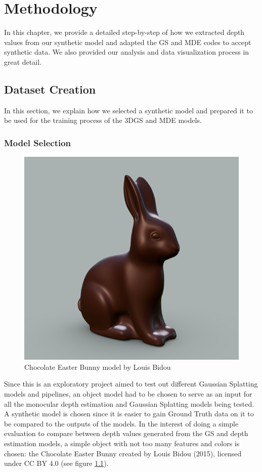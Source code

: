 
\chapter{Methodology}\label{chapter:methodology}

In this chapter, we provide a detailed step-by-step of how we extracted depth values from our synthetic model and adapted the GS and MDE codes to accept synthetic data. We also provided our analysis and data visualization process in great detail. 

\section{Dataset Creation}

In this section, we explain how we selected a synthetic model and prepared it to be used for the training process of the 3DGS and MDE models.

\subsection{Model Selection}

\begin{figure}[h]
    \centering
    \includegraphics[width=0.5\linewidth]{figures/chocolate-easter-bunny.png}
    \caption{Chocolate Easter Bunny model by Louis Bidou}
    \label{fig:chocolate-bunny}
\end{figure}

Since this is an exploratory project aimed to test out different Gaussian Splatting models and pipelines, an object model had to be chosen to serve as an input for all the monocular depth estimation and Gaussian Splatting models being tested. A synthetic model is chosen since it is easier to gain Ground Truth data on it to be compared to the outputs of the models. In the interest of doing a simple evaluation to compare between depth values generated from the GS and depth estimation models, a simple object with not too many features and colors is chosen: the Chocolate Easter Bunny created by Louis Bidou (2015), licensed under CC BY 4.0 (see figure \ref{fig:chocolate-bunny}).

